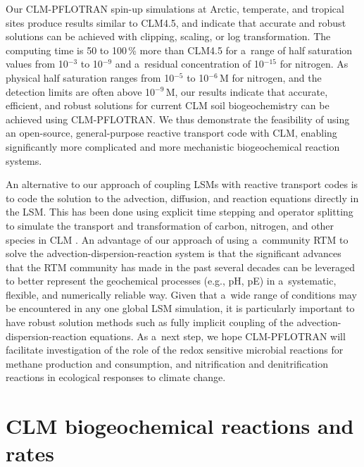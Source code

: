 \documentclass[gmdd, online, hvmath]{copernicus}
\begin{document}
      Our CLM-PFLOTRAN spin-up simulations at Arctic, temperate, and
      tropical sites produce results similar to CLM4.5, and indicate that
      accurate and robust solutions can be achieved with clipping, scaling, or
      log transformation. The computing time is 50 to 100\,{\%} more than
      CLM4.5 for a~range of half saturation values from 10$^{-3}$ to
      10$^{-9}$ and a~residual concentration of 10$^{-15}$ for nitrogen. As
      physical half saturation ranges from 10$^{-5}$ to 10$^{-6}$\,\unit{M}
      for nitrogen, and the detection limits are often above
      10$^{-9}$\,\unit{M}, our results indicate that accurate, efficient,
      and robust solutions for current CLM soil biogeochemistry can be
      achieved using CLM-PFLOTRAN.  We thus demonstrate the feasibility of
      using an open-source, general-purpose reactive transport code with
      CLM, enabling significantly more complicated and more mechanistic
      biogeochemical reaction systems.

      An alternative to our approach of coupling LSMs with reactive
      transport codes is to code the solution to the advection, diffusion,
      and reaction equations directly in the LSM. This has been done using
      explicit time stepping and operator splitting to simulate the
      transport and transformation of carbon, nitrogen, and other species in
      CLM \citep{Tang2013b}. An advantage of our approach of using
      a~community RTM to solve the advection-dispersion-reaction system is
      that the significant advances that the RTM community has made in the
      past several decades can be leveraged to better represent the
      geochemical processes (e.g., pH, pE) in a~systematic, flexible, and
      numerically reliable way. Given that a~wide range of conditions may be
      encountered in any one global LSM simulation, it is particularly
      important to have robust solution methods such as fully implicit
      coupling of the advection-dispersion-reaction equations.  As a~next
      step, we hope CLM-PFLOTRAN will facilitate investigation of the role
      of the redox sensitive microbial reactions for methane production and
      consumption, and nitrification and denitrification reactions in
      ecological responses to climate change.






\appendix

\section{CLM biogeochemical reactions and rates}%
\label{sec:clmbgc}
\end{document}
